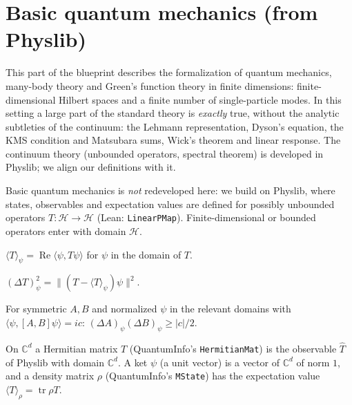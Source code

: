 \chapter{Basic quantum mechanics (from Physlib)}

This part of the blueprint describes the formalization of quantum mechanics, many-body theory and
Green's function theory in finite dimensions: finite-dimensional Hilbert spaces and a finite number of single-particle modes.
In this setting a large part of the standard theory is \emph{exactly} true, without the analytic subtleties of the continuum:
the Lehmann representation, Dyson's equation, the KMS condition and Matsubara sums, Wick's theorem and linear response.
The continuum theory (unbounded operators, spectral theorem) is developed in Physlib; we align our definitions with it.

Basic quantum mechanics is \emph{not} redeveloped here: we build on Physlib, where states, observables and
expectation values are defined for possibly unbounded operators $T\colon \mathcal H\to\mathcal H$
(Lean: \texttt{LinearPMap}). Finite-dimensional or bounded operators enter with domain $\mathcal H$.

\begin{definition}\label{def:expectation}
  \leanok
  $\langle T\rangle_\psi = \operatorname{Re}\langle\psi, T\psi\rangle$ for $\psi$ in the domain of $T$.
\end{definition}

\begin{definition}\label{def:variance}
  \leanok
  $(\Delta T)^2_\psi = \|(T-\langle T\rangle_\psi)\psi\|^2$.
\end{definition}

\begin{theorem}\label{thm:robertson}
  \leanok
  For symmetric $A,B$ and normalized $\psi$ in the relevant domains with $\langle\psi,[A,B]\psi\rangle = ic$:
  $(\Delta A)_\psi(\Delta B)_\psi\ge |c|/2$.
\end{theorem}

\begin{definition}\label{def:qinfo-bridge}
  \leanok
  On $\mathbb C^d$ a Hermitian matrix $T$ (QuantumInfo's \texttt{HermitianMat}) is the observable $\hat T$ of Physlib with
  domain $\mathbb C^d$. A ket $\psi$ (a unit vector) is a vector of $\mathbb C^d$ of norm $1$, and a density matrix
  $\rho$ (QuantumInfo's \texttt{MState}) has the expectation value $\langle T\rangle_\rho=\operatorname{tr}\rho T$.
\end{definition}

